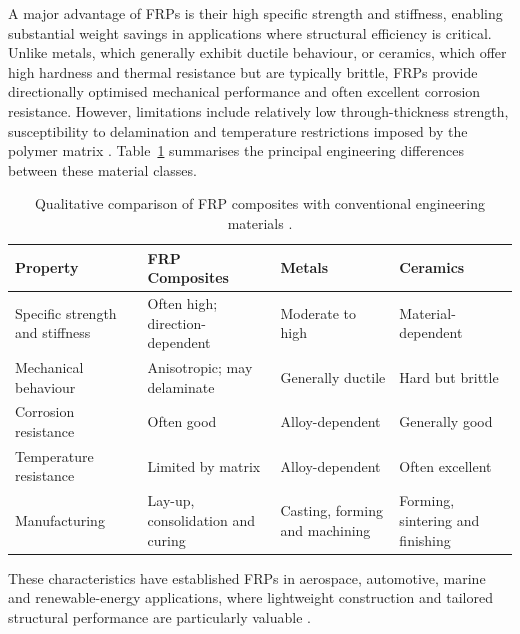 \documentclass[11pt,a4paper]{article}
\begin{document}
A major advantage of FRPs is their high specific strength and
stiffness, enabling substantial weight savings in applications where
structural efficiency is critical. Unlike metals, which generally
exhibit ductile behaviour, or ceramics, which offer high hardness and
thermal resistance but are typically brittle, FRPs provide
directionally optimised mechanical performance and often excellent
corrosion resistance. However, limitations include relatively low
through-thickness strength, susceptibility to delamination and
temperature restrictions imposed by the polymer matrix
\citep{mallick2007}. Table~\ref{tab:material_comparison} summarises
the principal engineering differences between these material classes.

\begin{table}[htbp]
    \centering
    \caption{Qualitative comparison of FRP composites with
    conventional engineering materials \citep{mallick2007}.}
    \label{tab:material_comparison}
    \small
    \renewcommand{\arraystretch}{1.15}
    \begin{tabularx}{\linewidth}{@{}p{2.5cm}XXX@{}}
        \toprule
        \textbf{Property} &
        \textbf{FRP Composites} &
        \textbf{Metals} &
        \textbf{Ceramics} \\
        \midrule
        Specific strength
        and stiffness &
        Often high; direction-dependent &
        Moderate to high &
        Material-dependent \\

        Mechanical
        behaviour &
        Anisotropic; may delaminate &
        Generally ductile &
        Hard but brittle \\

        Corrosion
        resistance &
        Often good &
        Alloy-dependent &
        Generally good \\

        Temperature
        resistance &
        Limited by matrix &
        Alloy-dependent &
        Often excellent \\

        Manufacturing &
        Lay-up, consolidation and curing &
        Casting, forming and machining &
        Forming, sintering and finishing \\
        \bottomrule
    \end{tabularx}
\end{table}

These characteristics have established FRPs in aerospace, automotive,
marine and renewable-energy applications, where lightweight
construction and tailored structural performance are particularly
valuable \citep{wu2026}.
\end{document}
